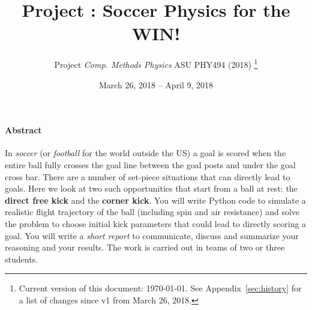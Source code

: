 \documentclass[letterpaper]{scrartcl}
\title{{\Large Project \anumber: Soccer Physics for the WIN!}}
\author{{\sffamily\large Project \emph{Comp. Methods Physics} ASU
    PHY494 (2018)}%
  \thanks{Current version of this document: \today. See
    Appendix~\protect\ref{sec:history} for a list of changes since v1
    from March 26, 2018.}}
\date{{\sffamily\large March 26, 2018 -- April 9, 2018}}
\begin{document}
\maketitle

\paragraph{Abstract}

In \emph{soccer} (or \emph{football} for the world outside the US) a
goal is scored when the entire ball fully crosses the goal line
between the goal posts and under the goal cross bar. There are a
number of set-piece situations that can directly lead to goals. Here
we look at two such opportunities that start from a ball at rest: the
\textbf{direct free kick} and the \textbf{corner kick}. You will write
Python code to simulate a realistic flight trajectory of the ball
(including spin and air resistance) and solve the problem to choose
initial kick parameters that could lead to directly scoring a
goal. You will write a \emph{short report} to communicate, discuss and
summarize your reasoning and your results. The work is carried out in
teams of two or three students.
\end{document}
